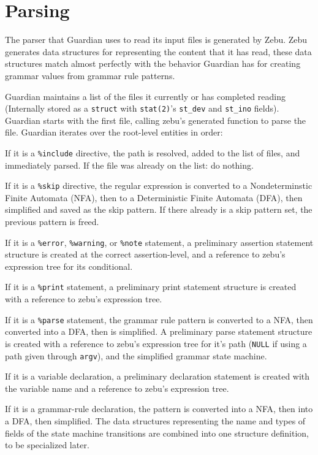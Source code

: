
\section{Parsing}
{
	The parser that Guardian uses to read its input files is generated by Zebu.
	Zebu generates data structures for representing the content that it has
	read, these data structures match almost perfectly with the behavior
	Guardian has for creating grammar values from grammar rule patterns.
	
	Guardian maintains a list of the files it currently or has completed
	reading (Internally stored as a \texttt{struct} with \texttt{stat(2)}'s
	\texttt{st\_dev} and \texttt{st\_ino} fields).
	Guardian starts with the first file,
	calling zebu's generated function to parse the
	file.
	Guardian iterates over the root-level entities in
	order:
	\begin{itemize}
	{
		\item If it is a \texttt{\%include} directive, the path is resolved,
		added to the list of files, and immediately parsed. If the file
		was already on the list: do nothing.
		
		\item If it is a \texttt{\%skip} directive, the regular expression
		is converted to a Nondeterminstic Finite Automata (NFA), then to
		a Deterministic Finite Automata (DFA), then simplified and saved as the
		skip pattern. If there already is a skip pattern set, the previous
		pattern is freed.
		
		\item If it is a \texttt{\%error}, \texttt{\%warning},
			or \texttt{\%note} statement, a preliminary assertion statement
			structure
			is created at the correct assertion-level, and a reference
			to zebu's expression tree for its conditional.
		
		\item If it is a \texttt{\%print} statement, a preliminary print
			statement structure is created with a reference to
			zebu's expression tree.
		
		\item If it is a \texttt{\%parse} statement, the grammar rule pattern
			is converted to a NFA, then converted
			into a DFA, then is simplified. A preliminary
			parse statement structure is created with a reference to
			zebu's expression tree for it's path (\texttt{NULL} if using
			a path given through \texttt{argv}), and the simplified grammar
			state machine.
		
		\item If it is a variable declaration, a preliminary
			declaration statement is created with the variable name and a
			reference to zebu's expression tree.
		
		\item If it is a grammar-rule declaration, the pattern is converted
			into a NFA, then into a DFA, then simplified.
			The data structures representing the name and types of fields
			of the state machine transitions are combined into one structure
			definition, to be specialized later.
	}
	\end{itemize}
}




















